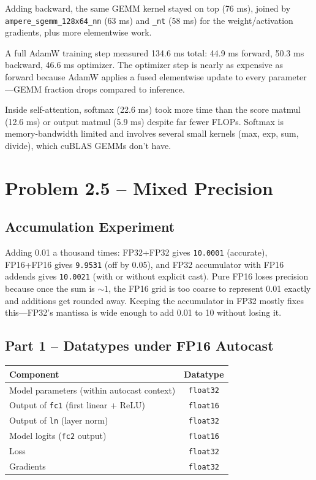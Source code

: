 \documentclass[11pt]{article}
\begin{document}
Adding backward, the same GEMM kernel stayed on top (76 ms), joined by \texttt{ampere\_sgemm\_128x64\_nn} (63 ms) and \texttt{\_nt} (58 ms) for the weight/activation gradients, plus more elementwise work.

A full AdamW training step measured 134.6 ms total: 44.9 ms forward, 50.3 ms backward, 46.6 ms optimizer. The optimizer step is nearly as expensive as forward because AdamW applies a fused elementwise update to every parameter---GEMM fraction drops compared to inference.

Inside self-attention, softmax (22.6 ms) took more time than the score matmul (12.6 ms) or output matmul (5.9 ms) despite far fewer FLOPs. Softmax is memory-bandwidth limited and involves several small kernels (max, exp, sum, divide), which cuBLAS GEMMs don't have.



\section{Problem 2.5 -- Mixed Precision}

\subsection*{Accumulation Experiment}

Adding 0.01 a thousand times: FP32+FP32 gives \texttt{10.0001} (accurate), FP16+FP16 gives \texttt{9.9531} (off by 0.05), and FP32 accumulator with FP16 addends gives \texttt{10.0021} (with or without explicit cast). Pure FP16 loses precision because once the sum is $\sim\!1$, the FP16 grid is too coarse to represent 0.01 exactly and additions get rounded away. Keeping the accumulator in FP32 mostly fixes this---FP32's mantissa is wide enough to add 0.01 to 10 without losing it.

\subsection*{Part 1 -- Datatypes under FP16 Autocast}

\begin{table}[h]
\centering
\begin{tabular}{lc}
\toprule
Component & Datatype \\
\midrule
Model parameters (within autocast context) & \texttt{float32} \\
Output of \texttt{fc1} (first linear + ReLU) & \texttt{float16} \\
Output of \texttt{ln} (layer norm) & \texttt{float32} \\
Model logits (\texttt{fc2} output) & \texttt{float16} \\
Loss & \texttt{float32} \\
Gradients & \texttt{float32} \\
\bottomrule
\end{tabular}
\end{table}
\end{document}
